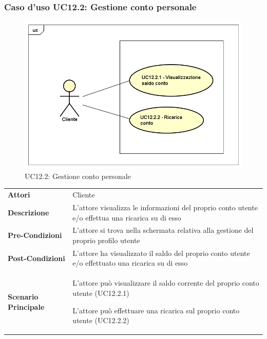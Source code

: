 \newpage
\subsubsection{Caso d'uso UC12.2: Gestione conto personale}
\label{UC12_2}
\begin{figure}[ht]
	\centering
	\includegraphics[scale=0.45]{UML/UC12_2.png}
	\caption{UC12.2: Gestione conto personale}
\end{figure}

\begin{minipage}{\linewidth}
	\begin{tabular}{ l | p{11cm}}
		\hline
		\rowcolor{Gray}
		\multicolumn{2}{c}{UC12.2 - Gestione conto personale} \\
		\hline
		\textbf{Attori} & Cliente \\
		\textbf{Descrizione} & L'attore visualizza le informazioni del proprio conto utente e/o effettua una ricarica su di esso \\
		\textbf{Pre-Condizioni} & L'attore si trova nella schermata relativa alla gestione del proprio profilo utente \\
		\textbf{Post-Condizioni} & L'attore ha visualizzato il saldo del proprio conto utente e/o effettuato una ricarica su di esso \\
		\textbf{Scenario Principale} & 
		\begin{enumerate*}[label=(\arabic*.),itemjoin={\newline}]
			\item L'attore può visualizzare il saldo corrente del proprio conto utente (UC12.2.1)
			\item L'attore può effettuare una ricarica sul proprio conto utente (UC12.2.2)
		\end{enumerate*}
	\end{tabular}
\end{minipage}

